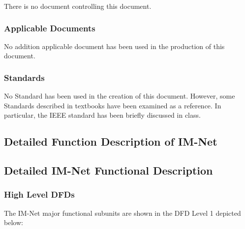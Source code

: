 \documentclass[letterpaper]{article}
\begin{document}
{There is no document controlling this document.

\textcolor{subsubsection}{\subsubsection{Applicable Documents}}

No addition applicable document has been used in the production of this document.

\textcolor{subsection}{\subsubsection{Standards}}

No Standard has been used in the creation of this document. However, some Standards described in textbooks have been examined as a reference. In particular, the IEEE standard has been briefly discussed in class.

\eject

\textcolor{section}{\section{Detailed Function Description of IM-Net}}

\textcolor{subsection}{\subsection{Detailed IM-Net Functional Description}}

\textcolor{subsubsection}{\subsubsection{High Level DFDs}}

The IM-Net major functional subunits are shown in the DFD Level 1 depicted below:

}
\end{document}
